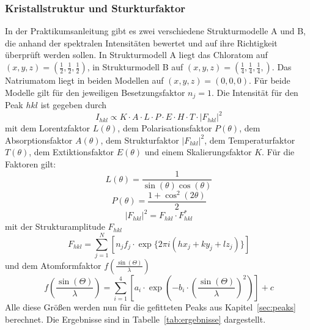 \subsubsection{Kristallstruktur und Sturkturfaktor}
\label{sec:kristallstruktur}

In der Praktikumsanleitung gibt es zwei verschiedene Strukturmodelle A und B, die anhand der spektralen Intensitäten bewertet und auf ihre Richtigkeit überprüft werden sollen.
In Strukturmodell A liegt das Chloratom auf $(x,y,z) = (\frac{1}{2}, \frac{1}{2}, \frac{1}{2})$, in Strukturmodell B auf $(x,y,z) = (\frac{1}{4},\frac{1}{4},\frac{1}{4},)$. Das Natriumatom liegt in beiden Modellen auf $(x,y,z) = (0,0,0)$. Für beide Modelle gilt für den jeweiligen Besetzungsfaktor $n_j = 1$. Die Intensität für den Peak $hkl$ ist gegeben durch
\begin{equation}
    I_{hkl} \propto K \cdot A \cdot L \cdot P \cdot E \cdot H \cdot T \cdot \left|F_{hkl}\right|^2
\end{equation}
mit dem Lorentzfaktor $L(\theta)$, dem Polarisationsfaktor $P(\theta)$, dem Absorptionsfaktor $A(\theta)$, dem Strukturfaktor $\left|F_{hkl}\right|^2$, dem Temperaturfaktor $T(\theta)$, dem Extiktionsfaktor $E(\theta)$ und einem Skalierungsfaktor $K$. Für die Faktoren gilt:
\begin{equation}
    L (\theta)= \frac{1}{\sin(\theta) \cos(\theta)}
\end{equation}
\begin{equation}
    P (\theta) = \frac{1 + \cos^2(2\theta)}{2}
\end{equation}
\begin{equation}
    \left|F_{hkl}\right|^2 = F_{hkl} \cdot F_{hkl}^*
\end{equation}
mit der Strukturamplitude $F_{hkl}$
\begin{equation}
    F_{hkl} = \sum_{j = 1}^{N} \left[n_j f_j \cdot \exp \{2\pi i \left(hx_j+ky_j+lz_j\right)\}\right]
\end{equation}
und dem Atomformfaktor $f\left(\frac{\sin\left(\Theta\right)}{\lambda}\right)$
\begin{equation}
    f\left(\frac{\sin\left(\Theta\right)}{\lambda}\right) = \sum_{i=1}^4 \left[a_i \cdot \exp\left(-b_i \cdot \left(\frac{\sin(\Theta)}{\lambda}\right)^2\right)\right] + c
\end{equation}
Alle diese Größen werden nun für die gefitteten Peaks aus Kapitel~\ref{sec:peaks} berechnet. Die Ergebnisse sind in Tabelle~\ref{tab:ergebnisse} dargestellt.
